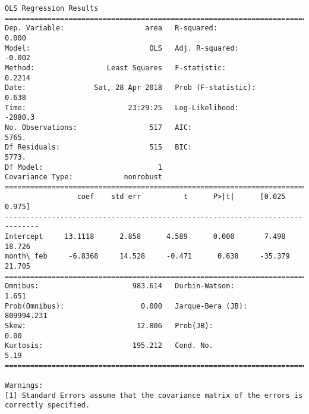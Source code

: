 \documentclass[11pt]{article}
\begin{document}
\begin{Verbatim}[commandchars=\\\{\}]
                            OLS Regression Results                            
==============================================================================
Dep. Variable:                   area   R-squared:                       0.000
Model:                            OLS   Adj. R-squared:                 -0.002
Method:                 Least Squares   F-statistic:                    0.2214
Date:                Sat, 28 Apr 2018   Prob (F-statistic):              0.638
Time:                        23:29:25   Log-Likelihood:                -2880.3
No. Observations:                 517   AIC:                             5765.
Df Residuals:                     515   BIC:                             5773.
Df Model:                           1                                         
Covariance Type:            nonrobust                                         
==============================================================================
                 coef    std err          t      P>|t|      [0.025      0.975]
------------------------------------------------------------------------------
Intercept     13.1118      2.858      4.589      0.000       7.498      18.726
month\_feb     -6.8368     14.528     -0.471      0.638     -35.379      21.705
==============================================================================
Omnibus:                      983.614   Durbin-Watson:                   1.651
Prob(Omnibus):                  0.000   Jarque-Bera (JB):           809994.231
Skew:                          12.806   Prob(JB):                         0.00
Kurtosis:                     195.212   Cond. No.                         5.19
==============================================================================

Warnings:
[1] Standard Errors assume that the covariance matrix of the errors is correctly specified.



\end{Verbatim}
\end{document}
